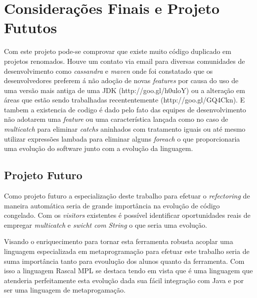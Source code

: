 \chapter{Considerações Finais e Projeto Fututos}
Com este projeto pode-se comprovar que existe muito código duplicado em projetos renomados. Houve um contato via email para diversas comunidades de desenvolvimento como \textit{cassandra} e \textit{maven} onde foi constatado que os desenvolvedores preferem á não adoção de novas \textit{features} por causa do uso de uma versão mais antiga de uma JDK (http://goo.gl/h0uloY) ou a alteração em áreas que estão sendo trabalhadas recententemente (http://goo.gl/GQ4Ckn). E tambem a existencia de codigo é dado pelo fato das equipes de desenvolvimento não adotarem uma \textit{feature} ou uma característica lançada como no caso de \textit{multicatch} para eliminar \textit{catchs} aninhados com tratamento iguais ou até mesmo utilizar expressões lambada para eliminar alguns \textit{foreach} o que proporcionaria uma evolução  do software junto com a evolução da linguagem.

\section{Projeto Futuro}
Como projeto futuro a especialização deste trabalho para efetuar o \textit{refectoring} de maneira automática seria de grande importância na evolução de código congelado. Com os \textit{visitors} existentes é possível identificar oportunidades reais de empregar \textit{multicatch} e \textit{swicht com String} o que seria uma evolução. 

Visando o enriquecimento para tornar esta ferramenta robusta acoplar uma linguagem especializada em metaprogramação para efetuar este trabalho seria de suma importância tanto para evoulução dos alunos quanto da ferramenta. Com isso a linguagem Rascal MPL se destaca tendo em vista que é uma linguagem que atenderia perfeitamente esta evolução dada sua fácil integração com Java e por ser uma linguagem de metaprogamação.

